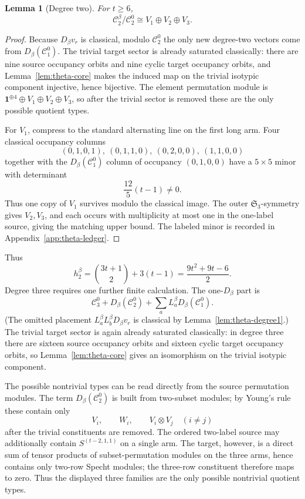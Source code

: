 \documentclass[11pt]{amsart}
\newtheorem{lem}[thm]{Lemma}
\theoremstyle{definition}
\theoremstyle{remark}
\newcommand{\cc}{\mathcal}
\begin{document}
\begin{lem}[Degree two]\label{lem:theta-degree2}
For $t\ge6$,
\[
\cc C_2^\beta/\cc C_2^0\cong V_1\oplus V_2\oplus V_3.
\]
\end{lem}

\begin{proof}
Because $D_\beta v_r$ is classical, modulo $\cc C_2^0$ the only new degree-two vectors come from $D_\beta(\cc C_1^0)$.  The trivial target sector is already saturated classically: there are nine source occupancy orbits and nine cyclic target occupancy orbits, and Lemma~\ref{lem:theta-core} makes the induced map on the trivial isotypic component injective, hence bijective.  The element permutation module is $\mathbf 1^{\oplus4}\oplus V_1\oplus V_2\oplus V_3$, so after the trivial sector is removed these are the only possible quotient types.

For $V_1$, compress to the standard alternating line on the first long arm.  Four classical occupancy columns
\[
(0,1,0,1),\ (0,1,1,0),\ (0,2,0,0),\ (1,1,0,0)
\]
together with the $D_\beta(\cc C_1^0)$ column of occupancy $(0,1,0,0)$ have a $5\times5$ minor with determinant
\[
\frac{12}{5}(t-1)\ne0.
\]
Thus one copy of $V_1$ survives modulo the classical image.  The outer $\mathfrak S_3$-symmetry gives $V_2,V_3$, and each occurs with multiplicity at most one in the one-label source, giving the matching upper bound.  The labeled minor is recorded in Appendix~\ref{app:theta-ledger}.
\end{proof}
Thus
\[
h_2^\beta=\binom{3t+1}{2}+3(t-1)=\frac{9t^2+9t-6}{2}.
\]
Degree three requires one further finite calculation.  The one-$D_\beta$ part is
\[
\cc C_3^0+D_\beta(\cc C_2^0)+\sum_aL_a^\beta D_\beta(\cc C_1^0).
\]
(The omitted placement $L_a^\beta L_b^\beta D_\beta v_r$ is classical by Lemma~\ref{lem:theta-degree1}.)  The trivial target sector is again already saturated classically: in degree three there are sixteen source occupancy orbits and sixteen cyclic target occupancy orbits, so Lemma~\ref{lem:theta-core} gives an isomorphism on the trivial isotypic component.

The possible nontrivial types can be read directly from the source permutation modules.  The term $D_\beta(\cc C_2^0)$ is built from two-subset modules; by Young's rule \cite{James} these contain only
\[
V_i,\qquad W_i,\qquad V_i\otimes V_j\quad(i\ne j)
\]
after the trivial constituents are removed.  The ordered two-label source may additionally contain $S^{(t-2,1,1)}$ on a single arm.  The target, however, is a direct sum of tensor products of subset-permutation modules on the three arms, hence contains only two-row Specht modules; the three-row constituent therefore maps to zero.  Thus the displayed three families are the only possible nontrivial quotient types.
\end{document}
